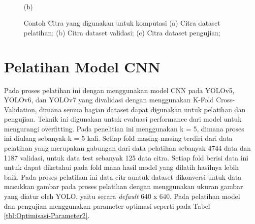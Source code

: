 \begin{figure}[H]
	\vspace{-0.2cm}\\
	(b)
	
	\captionsetup{justification=centering}
	\caption{Contoh Citra yang digunakan untuk komputasi (a) Citra dataset pelatihan; (b) Citra dataset validasi; (c) Citra dataset pengujian;}\label{img:Contoh-Citra-Yang-Digunakan-Untuk-Komputasi}
\end{figure}

\section{Pelatihan Model CNN}
\hspace{1,2cm}
Pada proses pelatihan ini dengan menggunakan model CNN pada YOLOv5, YOLOv6, dan YOLOv7 yang divalidasi dengan menggunakan K-Fold Cross-Validation, dimana semua bagian dataset dapat digunakan untuk pelatihan dan pengujian. Teknik ini digunakan untuk evaluasi performance dari model untuk mengurangi overfitting.  Pada penelitian ini menggunakan k = 5, dimana proses ini diulang sebanyak k = 5 kali. Setiap fold masing-masing terdiri dari data pelatihan yang merupakan gabungan dari data pelatihan sebanyak 4744 data dan 1187 validasi, untuk data test sebanyak 125 data citra. Setiap fold berisi data ini untuk dapat diketahui pada fold mana hasil model yang dilatih hasilnya lebih baik. Pada proses pelatihan ini data citr auntuk dataset dikonversi untuk data masukkan gambar pada proses pelatihan dengan menggunakan ukuran gambar yang diatur oleh YOLO, yaitu secara \textit{default} 640 x 640. Pada pelatihan model dan pengujian menggunakan parameter optimasi seperti pada Tabel \ref{tbl:Optimisasi-Parameter2}.

